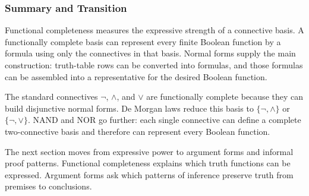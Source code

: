 \subsubsection*{Summary and Transition}

\begin{remark*}[Summary]
Functional completeness measures the expressive strength of a connective basis.
A functionally complete basis can represent every finite Boolean function by a
formula using only the connectives in that basis. Normal forms supply the main
construction: truth-table rows can be converted into formulas, and those
formulas can be assembled into a representative for the desired Boolean
function.
\end{remark*}

\begin{remark*}
The standard connectives \(\neg\), \(\land\), and \(\lor\) are functionally
complete because they can build disjunctive normal forms. De Morgan laws reduce
this basis to \(\{\neg,\land\}\) or \(\{\neg,\lor\}\). NAND and NOR go further:
each single connective can define a complete two-connective basis and therefore
can represent every Boolean function.
\end{remark*}

\begin{remark*}[Transition]
The next section moves from expressive power to argument forms and informal
proof patterns. Functional completeness explains which truth functions can be
expressed. Argument forms ask which patterns of inference preserve truth from
premises to conclusions.
\end{remark*}
